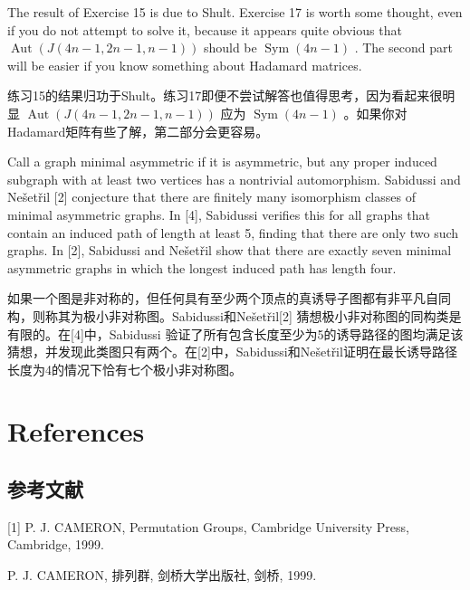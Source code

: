 \documentclass[10pt]{article}
\begin{document}
The result of Exercise 15 is due to Shult. Exercise 17 is worth some thought, even if you do not attempt to solve it, because it appears quite obvious that \(\operatorname{Aut}\left( {J\left( {{4n} - 1,{2n} - 1,n - 1}\right) }\right)\) should be \(\operatorname{Sym}\left( {{4n} - 1}\right)\) . The second part will be easier if you know something about Hadamard matrices.

\begin{tcolorbox}\relax
练习15的结果归功于Shult。练习17即便不尝试解答也值得思考，因为看起来很明显 \(\operatorname{Aut}\left( {J\left( {{4n} - 1,{2n} - 1,n - 1}\right) }\right)\) 应为 \(\operatorname{Sym}\left( {{4n} - 1}\right)\) 。如果你对Hadamard矩阵有些了解，第二部分会更容易。
\end{tcolorbox}

Call a graph minimal asymmetric if it is asymmetric, but any proper induced subgraph with at least two vertices has a nontrivial automorphism. Sabidussi and Nešetřil [2] conjecture that there are finitely many isomorphism classes of minimal asymmetric graphs. In [4], Sabidussi verifies this for all graphs that contain an induced path of length at least 5, finding that there are only two such graphs. In [2], Sabidussi and Nešetřil show that there are exactly seven minimal asymmetric graphs in which the longest induced path has length four.

\begin{tcolorbox}\relax
如果一个图是非对称的，但任何具有至少两个顶点的真诱导子图都有非平凡自同构，则称其为极小非对称图。Sabidussi和Nešetřil[2] 猜想极小非对称图的同构类是有限的。在[4]中，Sabidussi 验证了所有包含长度至少为5的诱导路径的图均满足该猜想，并发现此类图只有两个。在[2]中，Sabidussi和Nešetřil证明在最长诱导路径长度为4的情况下恰有七个极小非对称图。
\end{tcolorbox}

\section*{References}

\begin{tcolorbox}\relax
\section*{参考文献}
\end{tcolorbox}

[1] P. J. CAMERON, Permutation Groups, Cambridge University Press, Cambridge, 1999.

\begin{tcolorbox}\relax
[1] P. J. CAMERON, 排列群, 剑桥大学出版社, 剑桥, 1999.
\end{tcolorbox}
\end{document}
